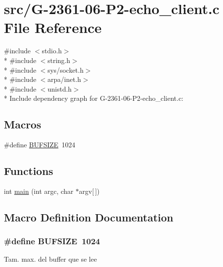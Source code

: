 \hypertarget{_g-2361-06-_p2-echo__client_8c}{}\section{src/\+G-\/2361-\/06-\/\+P2-\/echo\+\_\+client.c File Reference}
\label{_g-2361-06-_p2-echo__client_8c}
{\ttfamily \#include $<$stdio.\+h$>$}\\*
{\ttfamily \#include $<$string.\+h$>$}\\*
{\ttfamily \#include $<$sys/socket.\+h$>$}\\*
{\ttfamily \#include $<$arpa/inet.\+h$>$}\\*
{\ttfamily \#include $<$unistd.\+h$>$}\\*
Include dependency graph for G-\/2361-\/06-\/\+P2-\/echo\+\_\+client.c\+:
\subsection*{Macros}
\begin{DoxyCompactItemize}
\item 
\#define \hyperlink{_g-2361-06-_p2-echo__client_8c_aeca034f67218340ecb2261a22c2f3dcd}{B\+U\+F\+S\+I\+ZE}~1024
\end{DoxyCompactItemize}
\subsection*{Functions}
\begin{DoxyCompactItemize}
\item 
int \hyperlink{_g-2361-06-_p2-echo__client_8c_a0ddf1224851353fc92bfbff6f499fa97}{main} (int argc, char $\ast$argv\mbox{[}$\,$\mbox{]})
\end{DoxyCompactItemize}


\subsection{Macro Definition Documentation}
\subsubsection[{\texorpdfstring{B\+U\+F\+S\+I\+ZE}{BUFSIZE}}]{\setlength{\rightskip}{0pt plus 5cm}\#define B\+U\+F\+S\+I\+ZE~1024}\hypertarget{_g-2361-06-_p2-echo__client_8c_aeca034f67218340ecb2261a22c2f3dcd}{}\label{_g-2361-06-_p2-echo__client_8c_aeca034f67218340ecb2261a22c2f3dcd}
Tam. max. del buffer que se lee 

